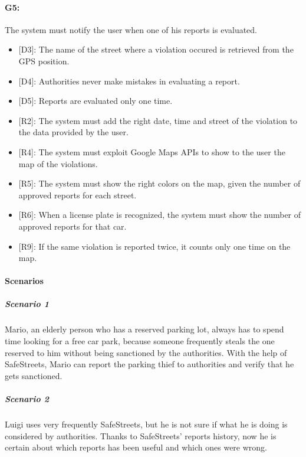\documentclass[12pt,a4paper]{report}
\begin{document}
			\paragraph {G5:} The system must notify the user when one of his reports is evaluated.
			\begin{itemize}
				\item{[D3]:} The name of the street where a violation occured is retrieved from the GPS position.
				\item{[D4]:} Authorities never make mistakes in evaluating a report.
				\item{[D5]:} Reports are evaluated only one time.
			\end{itemize}
			\begin{itemize}
				\item{[R2]:} The system must add the right date, time and street of the violation to the data provided by the user.
				\item{[R4]:} The system must exploit Google Maps APIs to show to the user the map of the violations.
				\item{[R5]:} The system must show the right colors on the map, given the number of approved reports for each street.
				\item{[R6]:} When a license plate is recognized, the system must show the number of approved reports for that car.
				\item{[R9]:} If the same violation is reported twice, it counts only one time on the map.
			\end{itemize}

\paragraph{Scenarios}

				\subparagraph{Scenario 1}
					Mario, an elderly person who has a reserved parking lot, always has to spend time looking for a free
					car park, because someone frequently steals the one reserved to him without being sanctioned by the
					authorities. With the help of SafeStreets, Mario can report the parking thief to authorities and verify
					that he gets sanctioned.
					
				\subparagraph{Scenario 2}
					Luigi uses very frequently SafeStreets, but he is not sure if what he is doing is considered by authorities.
					Thanks to SafeStreets' reports history, now he is certain about which reports has been useful and which ones
					were wrong.
					
\end{document}
